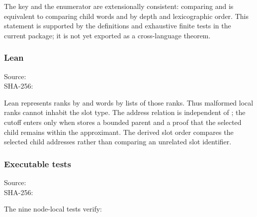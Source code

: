 The key and the enumerator are extensionally consistent: comparing
\texttt{\protect{}} and \texttt{\protect{}} is equivalent to
comparing child words \texttt{\protect{}} and
\texttt{\protect{}} by depth and lexicographic order. This
statement is supported by the definitions and exhaustive finite tests in
the current package; it is not yet exported as a cross-language theorem.

\subsubsection{Lean}\label{lean}

Source:
\texttt{\protect{}}\\
SHA-256:
\texttt{\protect{}}

Lean represents ranks by \texttt{\protect{}} and words by lists of
those ranks. Thus malformed local ranks cannot inhabit the slot type.
The address relation is independent of \texttt{\protect{}}; the cutoff enters
only when \texttt{\protect{}} stores a bounded parent and a proof
that the selected child remains within the approximant. The derived slot
order compares the selected child addresses rather than comparing an
unrelated slot identifier.

\subsubsection{Executable tests}\label{executable-tests}

Source:
\texttt{\protect{}}\\
SHA-256:
\texttt{\protect{}}

The nine node-local tests verify:

